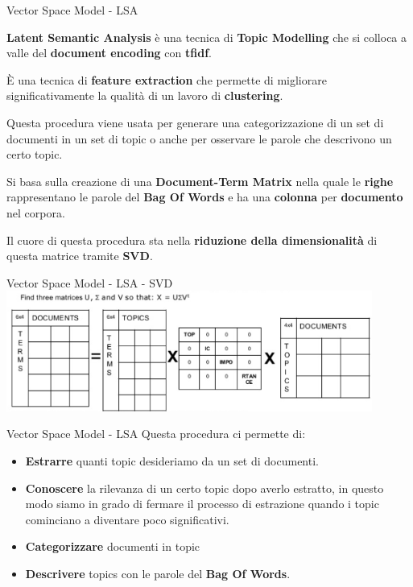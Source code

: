 \documentclass[british]{beamer}
\begin{document}
\begin{frame}{Vector Space Model - LSA}
	
	\textbf{Latent Semantic Analysis} \`{e} una tecnica di \textbf{Topic Modelling} che si colloca a valle del \textbf{document encoding} con \textbf{tfidf}. 
	
	\`{E} una tecnica di \textbf{feature extraction} che permette di migliorare significativamente la qualit\`{a} di un lavoro di \textbf{clustering}.
	
	Questa procedura viene usata per generare una categorizzazione di un \alert{set di documenti} in un \alert{set di topic} o anche per osservare le parole che descrivono un certo topic.
	
	Si basa sulla creazione di una \textbf{Document-Term Matrix} nella quale le \textbf{righe} rappresentano le parole del \textbf{Bag Of Words} e ha una \textbf{colonna} per \textbf{documento} nel corpora.
	
	Il cuore di questa procedura sta nella \textbf{riduzione della dimensionalit\`{a}} di questa matrice tramite \textbf{SVD}.
	
\end{frame}

\begin{frame}{Vector Space Model - LSA - SVD}
	\includegraphics[width=0.9\textwidth, height=0.4\textheight]{./Imgs/LSA1}
\end{frame}

\begin{frame}{Vector Space Model - LSA}
	Questa procedura ci permette di:
	\begin{itemize}
		\item \textbf{Estrarre} quanti topic desideriamo da un set di documenti.
		\item \textbf{Conoscere} la rilevanza di un certo topic dopo averlo estratto, in questo modo siamo in grado di fermare il processo di estrazione quando i topic cominciano a diventare poco significativi.
		\item \textbf{Categorizzare} documenti in topic
		\item \textbf{Descrivere} topics con le parole del \textbf{Bag Of Words}.
	\end{itemize}
\end{frame}
\end{document}
